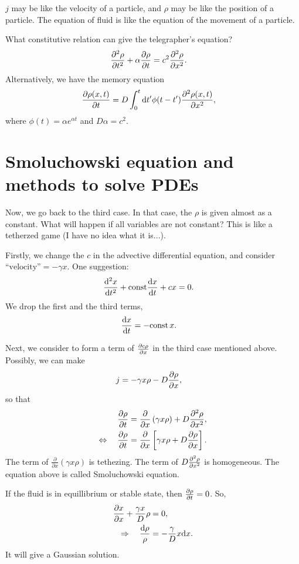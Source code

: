 $ j $ may be like the velocity of a particle, and $ \rho $ may be like the position of a particle. The equation of fluid is like the equation of the movement of a particle. 


What constitutive relation can give the telegrapher's equation?
\begin{align}
\frac{\partial^2 {\rho}}{\partial t^2} +\alpha \frac{\partial {\rho}}{\partial t} &= c^2 \frac{\partial^2 {\rho}}{\partial x^2}.
\end{align}
Alternatively, we have the memory equation
\begin{align}
\frac{\partial {\rho(x,t)}}{\partial t} &= D\int_0^t \mathrm{d} t' \phi (t-t') \frac{\partial^2 {\rho(x,t)}}{\partial x^2}, 
\end{align}
where $ \phi(t)=\alpha e^{\alpha t} $ and $ D\alpha=c^2 $. 

\section{Smoluchowski equation and methods to solve PDEs}
Now, we go back to the third case. In that case, the $ \rho $ is given almost as a constant. What will happen if all variables are not constant? This is like a tetherzed game (I have no idea what it is...). 

Firstly, we change the $ c $ in the advective differential equation, and consider $\text{``velocity''}=-\gamma x$. One suggestion:
\begin{align}
\frac{{\mathrm d}^2 {x}}{{\mathrm d}t^2} +\mathrm{const}\frac{{\mathrm d} {x}}{{\mathrm d}t} + c x&=0.
\end{align}
We drop the first and the third terms, 
\begin{align}
\frac{{\mathrm d} {x}}{{\mathrm d}t} &= -\mathrm{const}\, x.
\end{align}

Next, we consider to form a term of $ \frac{\partial {c\rho}}{\partial x} $ in the third case mentioned above. 
Possibly, we can make
\begin{align}
j &= -\gamma x\rho -D\frac{\partial {\rho}}{\partial x},
\end{align}
so that
\begin{align}
\frac{\partial {\rho}}{\partial t} &= \frac{\partial}{\partial x} \left( \gamma x\rho \right) + D\frac{\partial^2 {\rho}}{\partial x^2},\label{eq:Smoluchowski0}\\
\Leftrightarrow\quad \frac{\partial {\rho}}{\partial t} &= \frac{\partial}{\partial x} \left[ \gamma x\rho  + D\frac{\partial {\rho}}{\partial x}\right].\label{eq:Smoluchowski1}
\end{align}
The term of $\frac{\partial}{\partial x} \left( \gamma x\rho \right)  $ is tethezing. The term of $ D\frac{\partial^2 {\rho}}{\partial x^2} $ is homogeneous. The equation above is called Smoluchowski equation. 

If the fluid is in equillibrium or stable state, then $ \frac{\partial {\rho}}{\partial t}=0 $. So,
\begin{align}
\frac{\partial {x}}{\partial x} + \frac{\gamma x}{D}\rho &=0,\\
\Rightarrow\quad \frac{\mathrm{d} \rho}{\rho} &= -\frac{\gamma}{D} x \mathrm{d} x.
\end{align}
It will give a Gaussian solution. 

